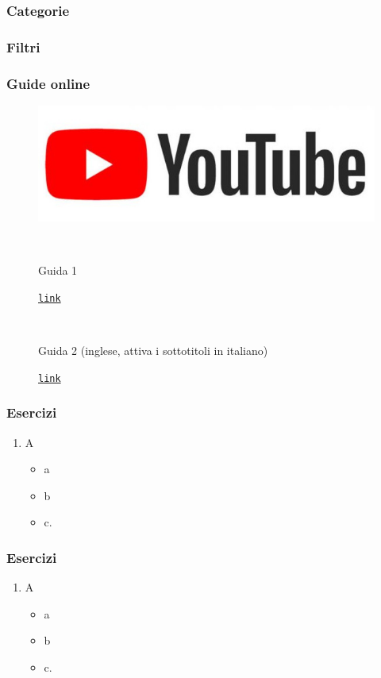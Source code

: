 \documentclass[handout]{beamer}
\begin{document}
\begin{frame}
\frametitle{Categorie}

\end{frame}




\begin{frame}
\frametitle{Filtri}

\end{frame}



\begin{frame}
\frametitle{}

\end{frame}


\begin{frame}
\frametitle{Guide online}
\begin{figure}
\includegraphics[width=.5\columnwidth]{img/ytlogo.jpg}

~

Guida 1

\href{link}{\texttt{link}}

~

Guida 2 (inglese, attiva i sottotitoli in italiano)

\href{link}{\texttt{link}}
\end{figure}
\end{frame}


\begin{frame}
\frametitle{Esercizi}
\begin{enumerate}
  \item A
  \begin{itemize}
    \item a
    \item b
    \item c.
  \end{itemize}
\end{enumerate}
\end{frame}



\begin{frame}
\frametitle{Esercizi}
\begin{enumerate}
  \item A
  \begin{itemize}
    \item a
    \item b
    \item c.
  \end{itemize}
\end{enumerate}
\end{frame}
\end{document}
